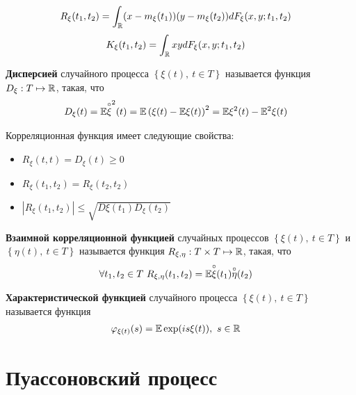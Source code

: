 \begin{align*}
  & R_\xi(t_1, t_2) = \int_{\mathbb{R}} (x-m_\xi(t_1))(y-m_\xi(t_2))dF_\xi(x,y;t_1,t_2)
\end{align*}
\begin{align*}
  & K_\xi(t_1, t_2) = \int_{\mathbb{R}} xy dF_\xi(x,y;t_1,t_2)
\end{align*}
\begin{Def}
    \textbf{Дисперсией} случайного процесса $\left\{\xi(t), \ t \in T\right\}$ называется функция $D_\xi: T \mapsto \mathbb{R}$, такая, что
    \begin{align*}
      & D_\xi(t) = \mathbb{E} \overset{\circ}{\xi}^2(t) = \mathbb{E} \left(\xi(t) - \mathbb{E} \xi(t)\right)^2 = \mathbb{E} \xi^2(t) - \mathbb{E}^2 \xi(t)
    \end{align*}
\end{Def}
Корреляционная функция имеет следующие свойства:
\begin{itemize}
    \item $R_\xi(t,t) = D_\xi(t) \geq 0$
    \item $R_\xi(t_1,t_2) = R_\xi(t_2,t_2)$
    \item $\left|R_\xi(t_1,t_2)\right|\leq \sqrt{D\xi(t_1)D_\xi(t_2)}$
\end{itemize}
\begin{Def}
    \textbf{Взаимной корреляционной функцией} случайных процессов $\left\{\xi(t), \ t \in T\right\}$ и $\left\{\eta(t), \ t \in T\right\}$ называется функция $R_{\xi, \eta}: T\times T \mapsto \mathbb{R}$, такая, что
    \begin{align*}
      & \forall t_1, t_2 \in T \ R_{\xi, \eta}(t_1, t_2) = \mathbb{E} \overset{\circ}{\xi}(t_1)\overset{\circ}{\eta}(t_2)
    \end{align*}
\end{Def}
\begin{Def}
    \textbf{Характеристической функцией} случайного процесса $\left\{\xi(t), \ t \in T\right\}$ называется функция
    \begin{align*}
      & \varphi_{\xi(t)}(s) = \mathbb{E} \exp (i s \xi(t)), \ s \in \mathbb{R}
    \end{align*}
\end{Def}
\section{Пуассоновский процесс}
